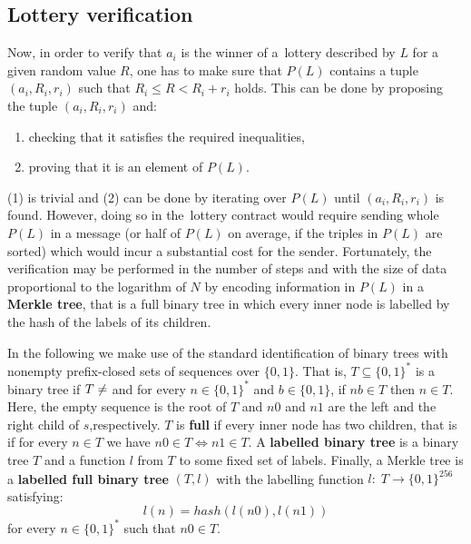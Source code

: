 \documentclass[a4paper]{article}
\begin{document}
\subsection{Lottery verification}
    \label{sec:lottery-verification}
    Now, in order to verify that $a_i$ is the winner of a~lottery described by $L$ for a given random value $R$,
    one has to make sure that $P(L)$ contains a tuple $(a_i, R_i, r_i)$ such that $R_i \leq R < R_i + r_i$ holds.
    This can be done by proposing the tuple $(a_i, R_i, r_i)$ and:
    \begin{enumerate}
        \item checking that it satisfies the required inequalities,
        \item proving that it is an element of $P(L)$.
    \end{enumerate}

    (1) is trivial and (2) can be done by iterating over $P(L)$ until $(a_i, R_i, r_i)$ is found. However,
    doing so in the~lottery contract would require sending whole $P(L)$ in a message (or half of $P(L)$ on average,
    if the triples in $P(L)$ are sorted) which would incur a substantial cost for the sender. Fortunately,
    the verification may be performed in the number of steps and with the size of data proportional to the logarithm
    of $N$ by encoding information in $P(L)$ in a \textbf{Merkle tree}, that is a full binary tree in which every inner node
    is labelled by the hash of the labels of its children.

    In the following we make use of the standard identification of binary trees with nonempty prefix-closed sets
    of sequences over $\{0,1\}$. That is, $T \subseteq \{0,1\}^*$ is a binary tree if $T \neq \empty$ and for every
    $n \in \{0,1\}^*$ and $b \in \{0,1\}$, if $nb \in T$ then $n \in T$. Here, the empty sequence is the
    root of $T$ and $n0$ and $n1$ are the left and the right child of $s$,respectively.
    $T$ is \textbf{full} if every inner node has two children, that is if for every $n \in T$ we have $n0 \in T \iff n1 \in T$.
    A \textbf{labelled binary tree} is a binary tree $T$ and a function $l$ from $T$ to some fixed set of labels.
    Finally, a Merkle tree is a \textbf{labelled full binary tree} $(T, l)$ with the labelling function
    $l:\; T \rightarrow \{0,1\}^{256}$ satisfying:
    \begin{displaymath}
        l(n) = hash(l(n0), l(n1))
    \end{displaymath}
    for every $n \in \{0,1\}^*$ such that $n0 \in T$.
\end{document}
